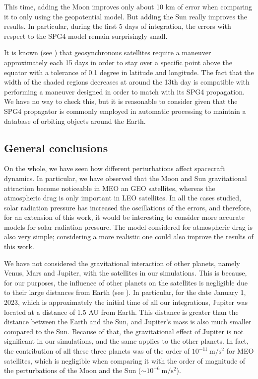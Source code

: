 \documentclass[../main.tex]{subfiles}
\begin{document}
This time, adding the Moon improves only about 10 km of error when comparing it to only using the geopotential model. But adding the Sun really improves the results. In particular, during the first 5 days of integration, the errors with respect to the SPG4 model remain surprisingly small.

It is known (see \cite{montenbruck}) that geosynchronous satellites require a maneuver approximately each 15 days in order to stay over a specific point above the equator with a tolerance of 0.1 degree in latitude and longitude. The fact that the width of the shaded regions decreases at around the 13th day is compatible with performing a maneuver designed in order to match with its SPG4 propagation. We have no way to check this, but it is reasonable to consider given that the SPG4 propagator is commonly employed in automatic processing to maintain a database of orbiting objects around the Earth.

\subsection{General conclusions}
On the whole, we have seen how different perturbations affect spacecraft dynamics. In particular, we have observed that the Moon and Sun gravitational attraction become noticeable in MEO an GEO satellites, whereas the atmospheric drag is only important in LEO satellites. In all the cases studied, solar radiation pressure has increased the oscillations of the errors, and therefore, for an extension of this work, it would be interesting to consider more accurate models for solar radiation pressure. The model considered for atmospheric drag is also very simple; considering a more realistic one could also improve the results of this work.

We have not considered the gravitational interaction of other planets, namely Venus, Mars and Jupiter, with the satellites in our simulations. This is because, for our purposes, the influence of other planets on the satellites is negligible due to their large distances from Earth (see \cite{montenbruck}). In particular, for the date January 1, 2023, which is approximately the initial time of all our integrations, Jupiter was located at a distance of 1.5 AU from Earth. This distance is greater than the distance between the Earth and the Sun, and Jupiter's mass is also much smaller compared to the Sun. Because of that, the gravitational effect of Jupiter is not significant in our simulations, and the same applies to the other planets. In fact, the contribution of all these three planets was of the order of $10^{-11}\ \mathrm{m/s^2}$ for MEO satellites, which is negligible when comparing it with the order of magnitude of the perturbations of the Moon and the Sun ($\sim 10^{-6}\ \mathrm{m/s^2}$).
\end{document}
